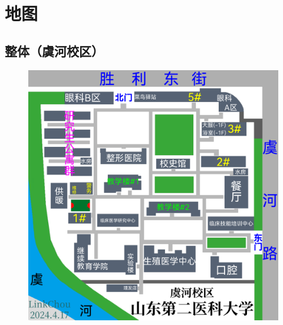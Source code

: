 \newpage
\section[地图]{地图}

\subsection[整体（虞河校区）]{整体（虞河校区）}
\noindent\begin{figure}[H]
    \centering
    \vspace{5em}
    \noindent\includegraphics*[width=\linewidth]{resources/map/虞河校区.pdf}
    \label{map_yuhe_holistic}
\end{figure}

\newpage
